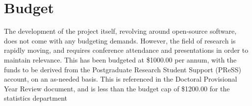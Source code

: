 \documentclass[a4paper,10pt]{article}
\begin{document}
\section{Budget}

The development of the project itself, revolving around open-source software, does not come with any budgeting demands.
However, the field of research is rapidly moving, and requires conference attendance and presentations in order to maintain relevance.
This has been budgeted at \$1000.00 per annum, with the funds to be derived from the Postgraduate Research Student Support (PReSS) account, on an as-needed basis.
This is referenced in the Doctoral Provisional Year Review document, and is less than the budget cap of \$1200.00 for the statistics department

\printbibliography
\end{document}
